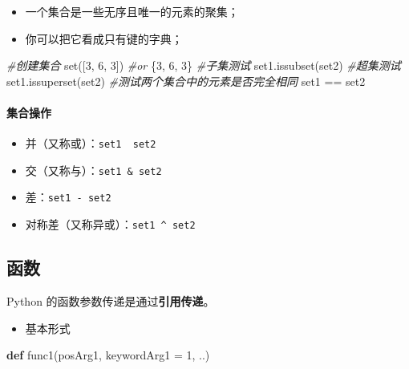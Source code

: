 \documentclass[]{article}
\newenvironment{Shaded}{}{}
\newcommand{\KeywordTok}[1]{\textcolor[rgb]{0.00,0.44,0.13}{\textbf{#1}}}
\newcommand{\DecValTok}[1]{\textcolor[rgb]{0.25,0.63,0.44}{#1}}
\newcommand{\CommentTok}[1]{\textcolor[rgb]{0.38,0.63,0.69}{\textit{#1}}}
\newcommand{\OperatorTok}[1]{\textcolor[rgb]{0.40,0.40,0.40}{#1}}
\newcommand{\BuiltInTok}[1]{#1}
\newcommand{\NormalTok}[1]{#1}
\let\oldparagraph\paragraph
\renewcommand{\paragraph}[1]{\oldparagraph{#1}\mbox{}}
\begin{document}
\begin{itemize}
\item
  一个集合是一些无序且唯一的元素的聚集；
\item
  你可以把它看成只有键的字典；
\end{itemize}

\begin{Shaded}
\begin{Highlighting}[]
\CommentTok{#创建集合}
\BuiltInTok{set}\NormalTok{([}\DecValTok{3}\NormalTok{, }\DecValTok{6}\NormalTok{, }\DecValTok{3}\NormalTok{])}
\CommentTok{#or}
\NormalTok{\{}\DecValTok{3}\NormalTok{, }\DecValTok{6}\NormalTok{, }\DecValTok{3}\NormalTok{\}}
\CommentTok{#子集测试}
\NormalTok{set1.issubset(set2)}
\CommentTok{#超集测试}
\NormalTok{set1.issuperset(set2)}
\CommentTok{#测试两个集合中的元素是否完全相同}
\NormalTok{set1 }\OperatorTok{==}\NormalTok{ set2}
\end{Highlighting}
\end{Shaded}

\paragraph{集合操作}\label{header-n203}

\begin{itemize}
\item
  并（又称或）：\texttt{set1\ \textbar{}\ set2}
\item
  交（又称与）：\texttt{set1\ \&\ set2}
\item
  差：\texttt{set1\ -\ set2}
\item
  对称差（又称异或）：\texttt{set1\ \^{}\ set2}
\end{itemize}

\hypertarget{header-n217}{\subsection{函数}\label{header-n217}}

Python 的函数参数传递是通过\textbf{引用传递}。

\begin{itemize}
\item
  基本形式
\end{itemize}

\begin{Shaded}
\begin{Highlighting}[]
\KeywordTok{def}\NormalTok{ func1(posArg1, keywordArg1 }\OperatorTok{=} \DecValTok{1}\NormalTok{, ..)}
\end{Highlighting}
\end{Shaded}
\end{document}
